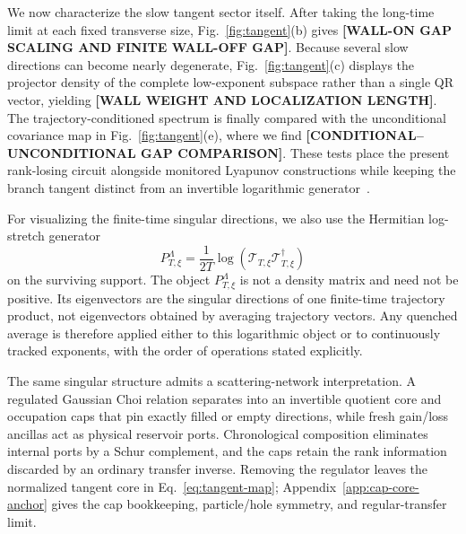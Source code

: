 \documentclass[aps,prx,twocolumn,superscriptaddress,longbibliography,nofootinbib,floatfix]{revtex4-2}
\newcommand{\cT}{\mathcal{T}}
\newcommand{\ResultValue}[1]{\textcolor{BrickRed}{\textbf{[#1]}}}
\begin{document}
We now characterize the slow tangent sector itself.  After taking the long-time limit at each fixed transverse size, Fig.~\ref{fig:tangent}(b) gives \ResultValue{WALL-ON GAP SCALING AND FINITE WALL-OFF GAP}.  Because several slow directions can become nearly degenerate, Fig.~\ref{fig:tangent}(c) displays the projector density of the complete low-exponent subspace rather than a single QR vector, yielding \ResultValue{WALL WEIGHT AND LOCALIZATION LENGTH}.  The trajectory-conditioned spectrum is finally compared with the unconditional covariance map in Fig.~\ref{fig:tangent}(e), where we find \ResultValue{CONDITIONAL--UNCONDITIONAL GAP COMPARISON}.  These tests place the present rank-losing circuit alongside monitored Lyapunov constructions while keeping the branch tangent distinct from an invertible logarithmic generator~\cite{Oshima2025,XiaoKawabata2026}.

For visualizing the finite-time singular directions, we also use the Hermitian log-stretch generator
\begin{equation}
 P_{T,\xi}^{\Lambda}=\frac{1}{2T}\log(\cT_{T,\xi}\cT_{T,\xi}^{\dagger})
\label{eq:quenched-log-object}
\end{equation}
on the surviving support.  The object $P_{T,\xi}^{\Lambda}$ is not a density matrix and need not be positive.  Its eigenvectors are the singular directions of one finite-time trajectory product, not eigenvectors obtained by averaging trajectory vectors.  Any quenched average is therefore applied either to this logarithmic object or to continuously tracked exponents, with the order of operations stated explicitly.

The same singular structure admits a scattering-network interpretation.  A regulated Gaussian Choi relation separates into an invertible quotient core and occupation caps that pin exactly filled or empty directions, while fresh gain/loss ancillas act as physical reservoir ports.  Chronological composition eliminates internal ports by a Schur complement, and the caps retain the rank information discarded by an ordinary transfer inverse.  Removing the regulator leaves the normalized tangent core in Eq.~\eqref{eq:tangent-map}; Appendix~\ref{app:cap-core-anchor} gives the cap bookkeeping, particle/hole symmetry, and regular-transfer limit.
\end{document}
